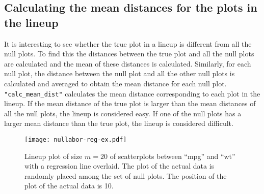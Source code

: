 \subsection{Calculating the mean distances for the plots in the
lineup}\label{calculating-the-mean-distances-for-the-plots-in-the-lineup}

It is interesting to see whether the true plot in a lineup is different
from all the null plots. To find this the distances between the true
plot and all the null plots are calculated and the mean of these
distances is calculated. Similarly, for each null plot, the distance
between the null plot and all the other null plots is calculated and
averaged to obtain the mean distance for each null plot.
\texttt{"calc\_mean\_dist"} calculates the mean distance corresponding
to each plot in the lineup. If the mean distance of the true plot is
larger than the mean distances of all the null plots, the lineup is
considered easy. If one of the null plots has a larger mean distance
than the true plot, the lineup is considered difficult.

\begin{figure*}[hbtp]
\begin{center}
\texttt{[image: nullabor-reg-ex.pdf]}
\caption{Lineup plot of size $m = 20$ of scatterplots between ``mpg'' and ``wt'' with a regression line overlaid. The plot of the actual data is randomly placed among the set of null plots. The position of the plot of the actual data is 10. }
\label{lineup-reg}
\end{center}
\end{figure*}

%

